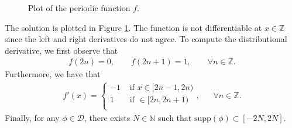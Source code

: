 \documentclass[11pt]{article}
\begin{document}
\begin{solution}
    \begin{figure}
    \centering
    \caption{Plot of the periodic function $f$.}
    \label{fig:ex5}
    \end{figure}
    The solution is plotted in Figure \ref{fig:ex5}. The function is not differentiable at $x \in \mathbb{Z}$ since the left and right derivatives do not agree.
     To compute the distributional derivative, we first observe that 
    \begin{align}
        f(2n) = 0, \qquad f(2n + 1) = 1, \qquad \forall n \in \mathbb{Z}.
    \end{align}
    Furthermore, we have that
    \begin{align}
        f'(x) = \begin{cases}
                -1 & \text{ if } x \in [2n - 1, 2n) \\
                 1 & \text{ if }  \in [2n, 2n + 1) \\
                \end{cases}, & & \forall n \in \mathbb{Z}.
    \end{align}
    Finally, for any $\phi \in \mathcal{D}$, there exists $N \in \mathbb{N}$ such that $\mathrm{supp}(\phi) \subset [-2N, 2N]$.
	\\
	

\end{solution}
\end{document}
